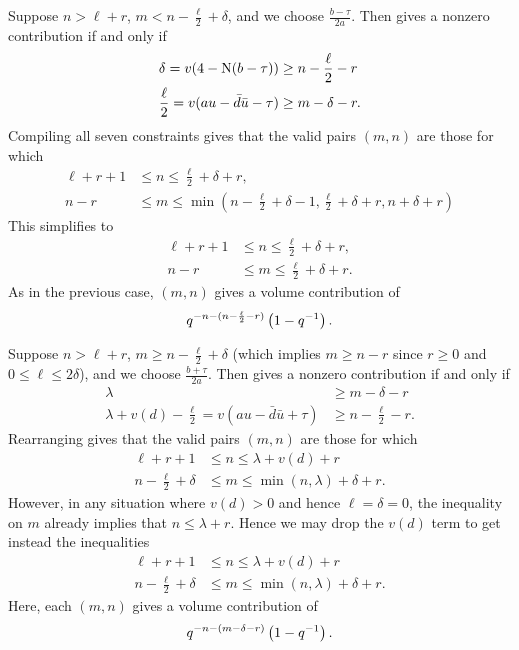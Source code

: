 \begin{description}
Suppose $n > \ell + r$,
$m < n - \frac{\ell}{2} + \delta$, and we choose $\frac{b-\tau}{2a}$.
Then  gives a nonzero contribution if and only if
\begin{align*}
  \delta = v(4-\operatorname{N}(b-\tau)) &\geq n - \frac{\ell}{2} - r \\
  \frac{\ell}{2} = v(au-\bar d \bar u - \tau) & \geq m - \delta - r.
\end{align*}
Compiling all seven constraints gives that the valid pairs $(m,n)$ are those for which
\begin{align*}
  \ell + r + 1 &\leq n \leq \frac{\ell}{2}+\delta+r, \\
  n-r &\leq m \leq \min\left( n - \frac{\ell}{2}+\delta - 1,
    \frac{\ell}{2} + \delta + r, n + \delta + r \right)
\end{align*}
This simplifies to
\begin{equation}
  \begin{aligned}
    \ell+r+1 &\leq n \leq \frac{\ell}{2}+\delta+r, \\
    n-r &\leq m \leq \frac{\ell}{2} + \delta + r.
  \end{aligned}
  \label{eq:even_case3_minus}
\end{equation}
As in the previous case, $(m,n)$ gives a volume contribution of
\[ q^{-n - (n - \frac{\ell}{2} - r)} \left( 1 - q^{-1} \right). \]

Suppose $n > \ell + r$,
$m \ge n - \frac{\ell}{2} + \delta$
(which implies $m \ge n-r$ since $r \ge 0$ and $0 \le \ell \le 2 \delta$),
and we choose $\frac{b+\tau}{2a}$.
Then  gives a nonzero contribution if and only if
\begin{align*}
  \lambda &\geq m - \delta - r \\
  \lambda + v(d) - \frac{\ell}{2} = v(au-\bar d \bar u + \tau) & \geq n - \frac{\ell}{2} - r.
\end{align*}
Rearranging gives that the valid pairs $(m,n)$ are those for which
\begin{align*}
  \ell + r + 1 &\leq n \leq \lambda + v(d) + r \\
  n - \frac{\ell}{2} + \delta &\leq m \leq \min(n, \lambda) + \delta + r.
\end{align*}
However, in any situation where $v(d) > 0$ and hence $\ell = \delta = 0$,
the inequality on $m$ already implies that $n \le \lambda + r$.
Hence we may drop the $v(d)$ term to get instead the inequalities
\begin{equation}
  \begin{aligned}
    \ell + r + 1 &\leq n \leq \lambda + v(d) + r \\
    n - \frac{\ell}{2} + \delta &\leq m \leq \min(n, \lambda) + \delta + r.
  \end{aligned}
  \label{eq:even_case4_plus}
\end{equation}
Here, each $(m,n)$ gives a volume contribution of
\[ q^{-n - (m - \delta - r)} \left( 1 - q^{-1} \right). \]


\end{description}
